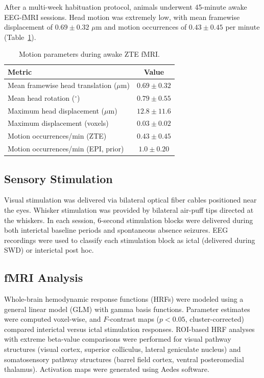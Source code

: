 \documentclass[12pt]{article}
\begin{document}
After a multi-week habituation protocol, animals underwent 45-minute awake EEG-fMRI sessions. Head motion was extremely low, with mean framewise displacement of $0.69 \pm 0.32$ $\mu$m and motion occurrences of $0.43 \pm 0.45$ per minute (Table~\ref{tab:motion}).

\begin{table}[htbp]
\centering
\caption{Motion parameters during awake ZTE fMRI.}
\label{tab:motion}
\begin{tabular}{lc}
\toprule
Metric & Value \\
\midrule
Mean framewise head translation ($\mu$m) & $0.69 \pm 0.32$ \\
Mean head rotation ($^\circ$) & $0.79 \pm 0.55$ \\
Maximum head displacement ($\mu$m) & $12.8 \pm 11.6$ \\
Maximum displacement (voxels) & $0.03 \pm 0.02$ \\
Motion occurrences/min (ZTE) & $0.43 \pm 0.45$ \\
Motion occurrences/min (EPI, prior) & $1.0 \pm 0.20$ \\
\bottomrule
\end{tabular}
\end{table}

\subsection{Sensory Stimulation}

Visual stimulation was delivered via bilateral optical fiber cables positioned near the eyes. Whisker stimulation was provided by bilateral air-puff tips directed at the whiskers. In each session, 6-second stimulation blocks were delivered during both interictal baseline periods and spontaneous absence seizures. EEG recordings were used to classify each stimulation block as ictal (delivered during SWD) or interictal post hoc.

\subsection{fMRI Analysis}

Whole-brain hemodynamic response functions (HRFs) were modeled using a general linear model (GLM) with gamma basis functions. Parameter estimates were computed voxel-wise, and $F$-contrast maps ($p < 0.05$, cluster-corrected) compared interictal versus ictal stimulation responses. ROI-based HRF analyses with extreme beta-value comparisons were performed for visual pathway structures (visual cortex, superior colliculus, lateral geniculate nucleus) and somatosensory pathway structures (barrel field cortex, ventral posteromedial thalamus). Activation maps were generated using Aedes software.
\end{document}
